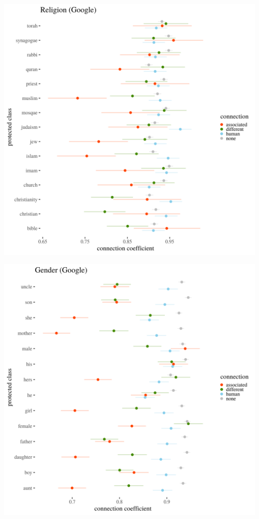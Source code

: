\documentclass[12pt,]{book}
\begin{document}

\includegraphics[width=14cm]{../images/visReligionGoogle.png}

\includegraphics[width=14cm]{../images/visGenderGoogle.png}
\end{document}
